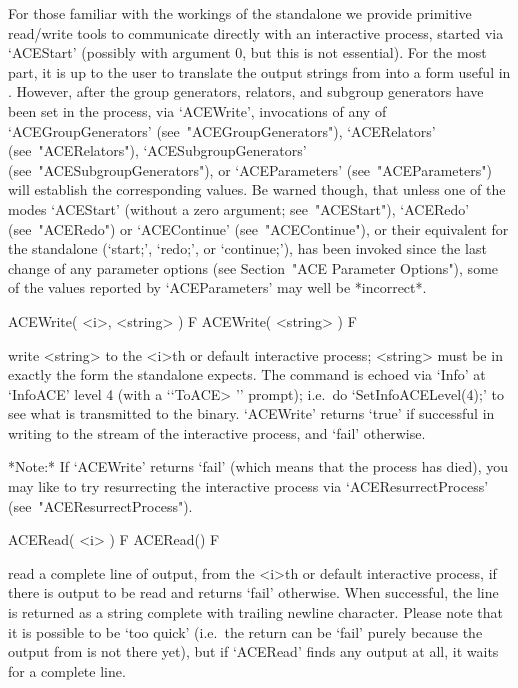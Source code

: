For those familiar with the  workings  of  the  {\ACE}  standalone  we
provide primitive read/write tools to  communicate  directly  with  an
interactive {\ACE} process,  started  via  `ACEStart'  (possibly  with
argument 0, but this is not essential). For the most part, it is up to
the user to translate the output  strings  from  {\ACE}  into  a  form
useful in {\GAP}. However, after the group generators,  relators,  and
subgroup  generators  have  been  set  in  the  {\ACE}  process,   via
`ACEWrite',    invocations    of    any    of     `ACEGroupGenerators'
(see~"ACEGroupGenerators"),     `ACERelators'     (see~"ACERelators"),
`ACESubgroupGenerators'       (see~"ACESubgroupGenerators"),        or
`ACEParameters' (see~"ACEParameters") will establish the corresponding
{\GAP} values.  Be  warned  though,  that  unless  one  of  the  modes
`ACEStart'  (without  a  zero  argument;  see~"ACEStart"),   `ACERedo'
(see~"ACERedo")  or  `ACEContinue'   (see~"ACEContinue"),   or   their
equivalent  for  the  standalone   {\ACE}   (`start;',   `redo;',   or
`continue;'), has been invoked since the last change of any  parameter
options (see Section~"ACE Parameter  Options"),  some  of  the  values
reported by `ACEParameters' may well be *incorrect*.

\beginitems

\>ACEWrite( <i>, <string> ) F
\>ACEWrite( <string> ) F

write <string> to the <i>th or  default  interactive  {\ACE}  process;
<string> must be in exactly the form the  {\ACE}  standalone  expects.
The command is  echoed  via  `Info'  at  `InfoACE'  level  4  (with  a
\lq{}`ToACE> '' prompt); i.e.~do `SetInfoACELevel(4);' to see what  is
transmitted  to  the  {\ACE}  binary.  `ACEWrite'  returns  `true'  if
successful in writing to the stream of the interactive {\ACE} process,
and `fail' otherwise.

*Note:*
If `ACEWrite' returns `fail' (which means that the {\ACE} process  has
died), you may like to try resurrecting the interactive {\ACE} process
via `ACEResurrectProcess' (see~"ACEResurrectProcess").

\>ACERead( <i> ) F
\>ACERead() F

read a complete line of {\ACE}  output,  from  the  <i>th  or  default
interactive {\ACE} process, if there is output to be read and  returns
`fail' otherwise. When successful, the line is returned  as  a  string
complete with trailing newline  character.  Please  note  that  it  is
possible to be \lq{}too quick' (i.e.~the return can be  `fail'  purely
because the output from {\ACE} is not there  yet),  but  if  `ACERead'
finds any output at all, it waits for a complete line.

